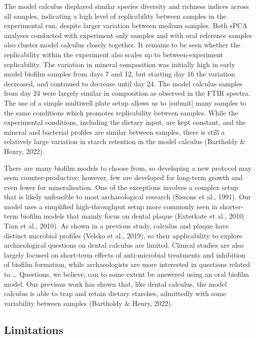 \documentclass[
]{article}
\begin{document}
The model calculus displayed similar species diversity and richness
indices across all samples, indicating a high level of replicability
between samples in the experimental run, despite larger variation
between medium samples. Both sPCA analyses conducted with experiment
only samples and with oral reference samples also cluster model calculus
closely together. It remains to be seen whether the replicability within
the experiment also scales up to between-experiment replicability. The
variation in mineral composition was initially high in early model
biofilm samples from days 7 and 12, but starting day 16 the variation
decreased, and continued to decrease until day 24. The model calculus
samples from day 24 were largely similar in composition as observed in
the FTIR spectra. The use of a simple multiwell plate setup allows us to
{[}submit{]} many samples to the same conditions which promotes
replicability between samples. While the experimental conditions,
including the dietary input, are kept constant, and the mineral and
bacterial profiles are similar between samples, there is still a
relatively large variation in starch retention in the model calculus
(Bartholdy \& Henry, 2022).

There are many biofilm models to choose from, so developing a new
protocol may seem counter-productive; however, few are developed for
long-term growth and even fewer for mineralisation. One of the
exceptions involves a complex setup that is likely unfeasible to most
archaeological research (Sissons et al., 1991). Our model uses a
simplified high-throughput setup more commonly seen in shorter-term
biofilm models that mainly focus on dental plaque (Exterkate et al.,
2010; Tian et al., 2010). As shown in a previous study, calculus and
plaque have distinct microbial profiles (Velsko et al., 2019), so their
applicability to explore archaeological questions on dental calculus are
limited. Clinical studies are also largely focused on short-term effects
of anti-microbial treatments and inhibition of biofilm formation, while
archaeologists are more interested in questions related to \ldots{}
Questions, we believe, can to some extent be answered using an oral
biofilm model. Our previous work has shown that, like dental calculus,
the model calculus is able to trap and retain dietary starches,
admittedly with some variability between samples (Bartholdy \& Henry,
2022).

\hypertarget{limitations}{%
\subsection{Limitations}\label{limitations}}
\end{document}
